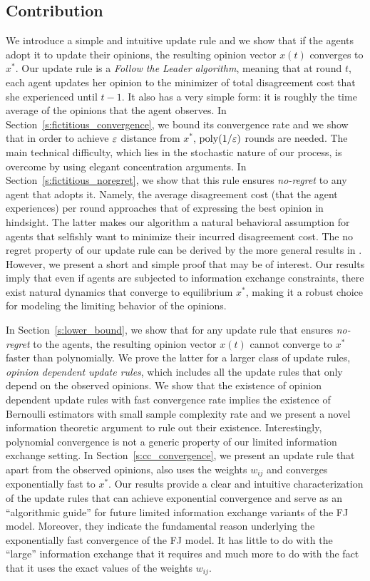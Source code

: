 \subsection{Contribution}

We introduce a simple and intuitive update rule and we show that if the agents
adopt it to update their opinions, the
resulting opinion vector $x(t)$ converges to $x^*$.  Our update rule is a
\emph{Follow the Leader algorithm}, meaning that at round $t$, each agent
updates her opinion to the minimizer of total disagreement cost that she
experienced until $t-1$.  It also has a very simple form: it is roughly the time average
of the opinions that the agent observes.  In
Section~\ref{s:fictitious_convergence}, we bound its convergence rate and we
show that in order to achieve $\varepsilon$ distance from $x^*$, $\mathrm{poly}(1/\varepsilon)$ rounds
are needed. The main technical difficulty, which lies in the stochastic nature of our
process, is overcome by using elegant concentration arguments.  In
Section~\ref{s:fictitious_noregret}, we show that this rule ensures
\emph{no-regret} to any agent that adopts it.  Namely, the average disagreement
cost (that the agent experiences) per round approaches that of expressing the
best opinion in hindsight.  The latter makes our algorithm a natural behavioral
assumption for agents that selfishly want to minimize their incurred
disagreement cost.  The no regret property of our update rule can be derived by
the more general results in \cite{HAK07}.  However, we present a short and
simple proof that may be of interest.  Our results imply that even if agents
are subjected to information exchange constraints, there exist natural
dynamics that converge to equilibrium $x^*$, making it a robust choice for
modeling the limiting behavior of the opinions.

In Section~\ref{s:lower_bound}, we show that for any update rule that ensures
\emph{no-regret} to the agents, the resulting opinion vector $x(t)$ cannot
converge to $x^*$ faster than polynomially.  We prove the latter for a larger
class of update rules, \emph{opinion dependent update rules}, which includes all
the update rules that only depend on the observed opinions.  We show that
the existence of opinion dependent update rules with fast convergence rate
implies the existence of Bernoulli estimators with small sample complexity rate and we
present a novel information theoretic argument to rule out their existence.
Interestingly, polynomial convergence is not a generic property of our limited
information exchange setting.  In Section~\ref{s:cc_convergence}, we present an
update rule that apart from the observed opinions, also uses the weights
$w_{ij}$ and converges exponentially fast to $x^*$. Our results provide a clear
and intuitive characterization of the update rules that can achieve exponential
convergence and serve as an \enquote{algorithmic guide} for future limited
information exchange variants of the FJ model.  Moreover, they indicate the
fundamental reason underlying the exponentially fast convergence of the FJ model.
It has
little to do with the \enquote{large} information exchange that it requires and
much more to do with the fact that it uses the exact values of the weights
$w_{ij}$.

